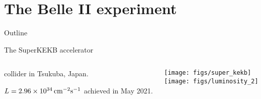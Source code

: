 \section{The Belle II experiment}
\begin{frame}[noframenumbering]{Outline}
 \tableofcontents[currentsection]
\end{frame}
\begin{frame}{The SuperKEKB accelerator}
\begin{columns}
\begin{column}{0.48\linewidth} 
\bi \small
\item{\epem collider in Tsukuba, Japan.}
\bi
\item{$L=2.96\times10^{34}{\rm \,cm}^{-2} {\rm s}^{-1}$ achieved in May 2021.}
\ei
\ei
\end{column}
\begin{column}{0.52\linewidth}
\centering
\texttt{[image: figs/super\_kekb]}\\
\vspace{0.1cm}
\texttt{[image: figs/luminosity\_2]}
\end{column}
\end{columns}
\end{frame}

